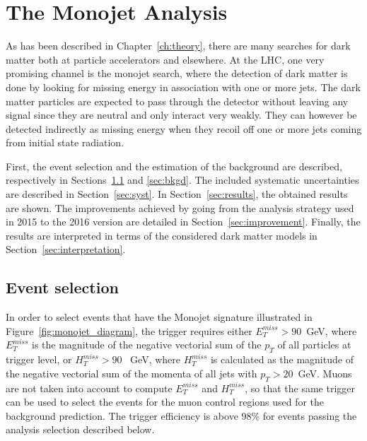 \graphicspath{{chapt_dutch/}{intro/}{monojet/}}

\renewcommand\evenpagerightmark{{\scshape\small Chapter 5}}
\renewcommand\oddpageleftmark{{\scshape\small The Monojet Analysis}}

\hyphenation{}

\chapter{The Monojet Analysis}
\label{ch:monojet}

As has been described in Chapter~\ref{ch:theory}, there are many searches for dark matter both at 
particle accelerators and elsewhere. At the \ac{LHC}, one very promising channel is the 
monojet search, where the detection of dark matter is done by looking for missing energy in association 
with one or more jets. The dark matter particles are expected to pass through the detector without leaving any signal since they are neutral and only interact very weakly. They can however be detected indirectly as missing energy when they recoil off one or more jets coming from initial state radiation.

First, the event selection and the estimation of the background are described, respectively in Sections~\ref{sec:selection} and \ref{sec:bkgd}. The included systematic uncertainties are described in Section~\ref{sec:syst}. In Section~\ref{sec:results}, the obtained results are shown. The improvements achieved by going from the analysis strategy used in 2015 to the 2016 version are detailed in Section~\ref{sec:improvement}. Finally, the results are interpreted in terms of the considered dark matter models in Section~\ref{sec:interpretation}.


\section{Event selection}
\label{sec:selection}

In order to select events that have the Monojet signature illustrated in Figure~\ref{fig:monojet_diagram}, the trigger requires either $E_T^{miss} > 90$~GeV, where $E_T^{miss}$ is the magnitude of the negative vectorial sum of the $p_T$ of all particles at trigger level, or $H_T^ {miss} > 90$ ~GeV, where $H_T^{miss}$ is calculated as the magnitude of the negative vectorial sum of the momenta of all jets with $p_T > 20$~GeV. Muons are not taken into account to compute $E_T^{miss}$ and $H_T^{miss}$, so that the same trigger can be used to select the events for the muon control regions used for the background prediction. The trigger efficiency is above 98\% for events passing the analysis selection described below.

